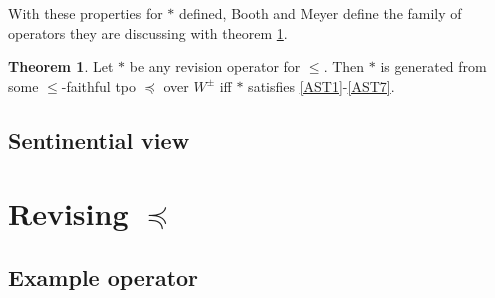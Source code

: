 \documentclass[english, 12pt]{scrartcl}
\theoremstyle{definition}
\theoremstyle{definition}
\theoremstyle{definition}
\newtheorem{theorem}{Theorem}
\begin{document}
\bigskip

With these properties for $\ast$ defined, Booth and Meyer define the family of operators they are discussing with theorem \ref{theorem:revision-operator}.


\begin{theorem}
\label{theorem:revision-operator}Let $\ast$ be any revision operator for $\leq$. Then $\ast$ is generated from some $\leq$-faithful tpo $\preceq$ over $W^{\pm}$ iff $\ast$ satisfies \ref{AST1}-\ref{AST7}. \cite{Booth2011}
\end{theorem}


\subsection{Sentinential view}

\section{Revising $\preceq$}
\subsection{Example operator}
\end{document}
